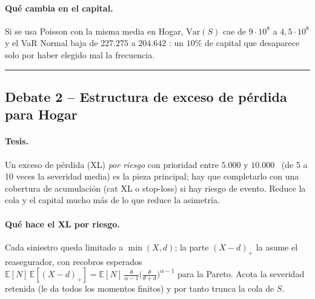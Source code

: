 \documentclass[a4paper,12pt]{article}
\newcommand{\euro}{\texteuro}
\newcommand{\E}{\mathbb{E}}
\newcommand{\Var}{\mathrm{Var}}
\begin{document}
\paragraph{Qu\'e cambia en el capital.} Si se usa Poisson con la misma media en Hogar, $\Var(S)$ cae de $9\cdot10^8$ a $4{,}5\cdot10^8$ y el VaR Normal baja de $227.275$ a $204.642$ \euro: un $10\%$ de capital que desaparece solo por haber elegido mal la frecuencia.

\bigskip\hrule\bigskip

\subsection{Debate 2 -- Estructura de exceso de p\'erdida para Hogar}

\paragraph{Tesis.} Un exceso de p\'erdida (XL) \emph{por riesgo} con prioridad entre $5.000$ y $10.000$ \euro\ (de 5 a 10 veces la severidad media) es la pieza principal; hay que completarlo con una cobertura de acumulaci\'on (cat XL o stop-loss) si hay riesgo de evento. Reduce la cola y el capital mucho m\'as de lo que reduce la asimetr\'ia.

\paragraph{Qu\'e hace el XL por riesgo.} Cada siniestro queda limitado a $\min(X,d)$; la parte $(X-d)_+$ la asume el reasegurador, con recobros esperados $\E[N]\,\E[(X-d)_+]=\E[N]\,\frac{\theta}{\alpha-1}\big(\frac{\theta}{\theta+d}\big)^{\alpha-1}$ para la Pareto. Acota la severidad retenida (le da todos los momentos finitos) y por tanto trunca la cola de $S$.
\end{document}
